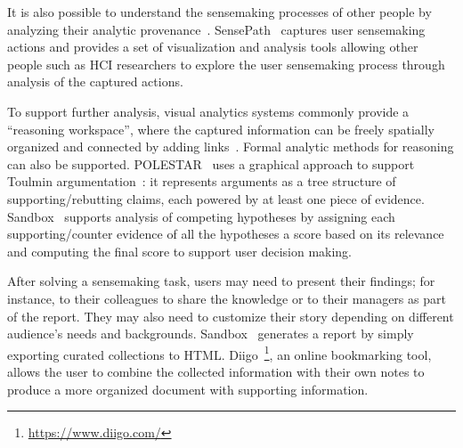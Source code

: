 It is also possible to understand the sensemaking processes of other people by analyzing their analytic provenance~\cite{Dou2010}. SensePath~\cite{Nguyen2016} captures user sensemaking actions and provides a set of visualization and analysis tools allowing other people such as HCI researchers to explore the user sensemaking process through analysis of the captured actions.


To support further analysis, visual analytics systems commonly provide a ``reasoning workspace'', where the captured information can be freely spatially organized and connected by adding links~\cite{Shrinivasan2008, Xu2014}. Formal analytic methods for reasoning can also be supported. POLESTAR~\cite{Pioch2006} uses a graphical approach to support Toulmin argumentation~\cite{Toulmin2003}: it represents arguments as a tree structure of supporting/rebutting claims, each powered by at least one piece of evidence. Sandbox~\cite{Wright2006} supports analysis of competing hypotheses by assigning each supporting/counter evidence of all the hypotheses a score based on its relevance  and computing the final score to support user decision making.

After solving a sensemaking task, users may need to present their findings; for instance, to their colleagues to share the knowledge or to their managers as part of the report. They may also need to customize their story depending on different audience's needs and backgrounds. Sandbox~\cite{Wright2006} generates a report by simply exporting curated collections to HTML. Diigo~\footnote{\url{https://www.diigo.com/}}, an online bookmarking tool, allows the user to combine the collected information with their own notes to produce a more organized document with supporting information.

